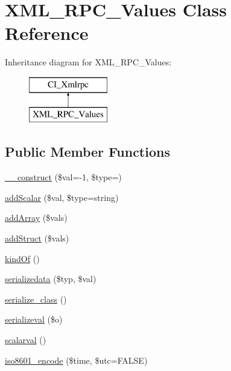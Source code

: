 \hypertarget{class_x_m_l___r_p_c___values}{}\section{X\+M\+L\+\_\+\+R\+P\+C\+\_\+\+Values Class Reference}
\label{class_x_m_l___r_p_c___values}
Inheritance diagram for X\+M\+L\+\_\+\+R\+P\+C\+\_\+\+Values\+:\begin{figure}[H]
\begin{center}
\leavevmode
\includegraphics[height=2.000000cm]{class_x_m_l___r_p_c___values}
\end{center}
\end{figure}
\subsection*{Public Member Functions}
\begin{DoxyCompactItemize}
\item 
\mbox{\hyperlink{class_x_m_l___r_p_c___values_af3d459d43acf9109a9604d02b12ccf44}{\+\_\+\+\_\+construct}} (\$val=-\/1, \$type=\textquotesingle{}\textquotesingle{})
\item 
\mbox{\hyperlink{class_x_m_l___r_p_c___values_ac847166eee63ab7bfaa8b0e22ae19430}{add\+Scalar}} (\$val, \$type=\textquotesingle{}string\textquotesingle{})
\item 
\mbox{\hyperlink{class_x_m_l___r_p_c___values_a2081e6a72b7e1c15f8c1dbcdfa673d4c}{add\+Array}} (\$vals)
\item 
\mbox{\hyperlink{class_x_m_l___r_p_c___values_a5dbdf0121566791a201cd07a3de15531}{add\+Struct}} (\$vals)
\item 
\mbox{\hyperlink{class_x_m_l___r_p_c___values_a3b169c364729cee2afdccadef5229f80}{kind\+Of}} ()
\item 
\mbox{\hyperlink{class_x_m_l___r_p_c___values_a7058e00e310218c447d3c9fea0ee0a3d}{serializedata}} (\$typ, \$val)
\item 
\mbox{\hyperlink{class_x_m_l___r_p_c___values_a59df3d3c8fbb47a946d6a29f0b3c8e0c}{serialize\+\_\+class}} ()
\item 
\mbox{\hyperlink{class_x_m_l___r_p_c___values_a1a4bfc79985c185745d96ebe3a1e5c3d}{serializeval}} (\$o)
\item 
\mbox{\hyperlink{class_x_m_l___r_p_c___values_ac9a3751dc2d5479f409d0a4683c37d26}{scalarval}} ()
\item 
\mbox{\hyperlink{class_x_m_l___r_p_c___values_a201f99ae311bb2c53526933576c890d0}{iso8601\+\_\+encode}} (\$time, \$utc=F\+A\+L\+SE)
\end{DoxyCompactItemize}
